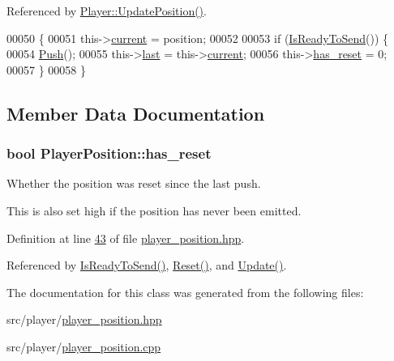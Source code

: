 Referenced by \hyperlink{player__position_8cpp_source_l00026}{Player\+::\+Update\+Position()}.


\begin{DoxyCode}
00050 \{
00051     this->\hyperlink{classPlayerPosition_a043f477d249cca2eaa00e0e616888bea}{current} = position;
00052 
00053     \textcolor{keywordflow}{if} (\hyperlink{classPlayerPosition_a52f46d4c600724b7ce9f459b93609dc3}{IsReadyToSend}()) \{
00054         \hyperlink{classResponseSource_a6e3b93326ee043f6d60510acd08de69b}{Push}();
00055         this->\hyperlink{classPlayerPosition_a4adeb717201c469c16236c2d2d6f9cef}{last} = this->\hyperlink{classPlayerPosition_a043f477d249cca2eaa00e0e616888bea}{current};
00056         this->\hyperlink{classPlayerPosition_a876749ea389ec23a8af6fe26e3e13883}{has\_reset} = 0;
00057     \}
00058 \}
\end{DoxyCode}


\subsection{Member Data Documentation}
\hypertarget{classPlayerPosition_a876749ea389ec23a8af6fe26e3e13883}{
\subsubsection[{has\+\_\+reset}]{\setlength{\rightskip}{0pt plus 5cm}bool Player\+Position\+::has\+\_\+reset\hspace{0.3cm}{\ttfamily [private]}}}\label{classPlayerPosition_a876749ea389ec23a8af6fe26e3e13883}


Whether the position was reset since the last push. 

This is also set high if the position has never been emitted. 

Definition at line \hyperlink{player__position_8hpp_source_l00043}{43} of file \hyperlink{player__position_8hpp_source}{player\+\_\+position.\+hpp}.



Referenced by \hyperlink{player__position_8cpp_source_l00075}{Is\+Ready\+To\+Send()}, \hyperlink{player__position_8cpp_source_l00060}{Reset()}, and \hyperlink{player__position_8cpp_source_l00049}{Update()}.



The documentation for this class was generated from the following files\+:\begin{DoxyCompactItemize}
\item 
src/player/\hyperlink{player__position_8hpp}{player\+\_\+position.\+hpp}\item 
src/player/\hyperlink{player__position_8cpp}{player\+\_\+position.\+cpp}\end{DoxyCompactItemize}
